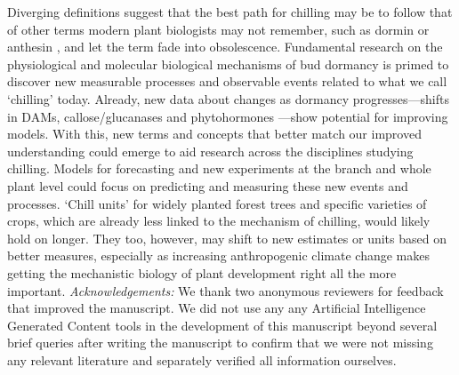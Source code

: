 \documentclass[11pt]{article}
\newcommand{\R}[1]{\label{#1}\linelabel{#1}}
\begin{document}
Diverging definitions suggest that the best path for chilling may be to follow that of other terms modern plant biologists may not remember, such as dormin or anthesin \citep[hypothesized compounds to induce dormancy and floral anthesis, respectively,][]{aksenova2006florigen,dorffling2015discovery}, and let the term fade into obsolescence. Fundamental research on the physiological and molecular biological mechanisms of bud dormancy is primed to discover new measurable processes and observable events related to what we call `chilling' today. \R{r1molatendS}Already, new data about changes as dormancy progresses---shifts in DAMs, callose/glucanases and phytohormones  \citep[Figure \ref{fig:modelsketch},][]{tuan2017dormancy,rinne2018,tylewicz2018photoperiodic,pan2023epigenetic,andre2022populus}---show potential for improving models.\R{r1molatendE} With this, new terms and concepts that better match our improved understanding could emerge to aid research across the disciplines studying chilling. Models for forecasting and new experiments at the branch and whole plant level could focus on predicting and measuring these new events and processes. `Chill units'  for widely planted forest trees and specific varieties of crops, which are already less linked to the mechanism of chilling, would likely hold on longer. They too, however, may shift to new estimates or units based on better measures, especially as increasing anthropogenic climate change makes getting the mechanistic biology of plant development right all the more important. 
\newpage
\emph{Acknowledgements:} We thank two anonymous reviewers for feedback that improved the manuscript. We did not use any any Artificial Intelligence Generated Content tools in the development of this manuscript beyond several brief queries after writing the manuscript to confirm that we were not missing any relevant literature and separately verified all information ourselves. \\%
\end{document}
